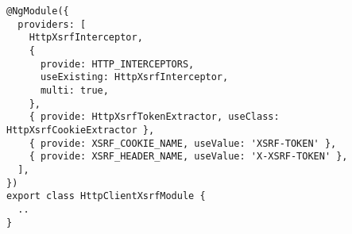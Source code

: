 \begin{verbatim}
@NgModule({
  providers: [
    HttpXsrfInterceptor,
    {
      provide: HTTP_INTERCEPTORS,
      useExisting: HttpXsrfInterceptor,
      multi: true,
    },
    { provide: HttpXsrfTokenExtractor, useClass: HttpXsrfCookieExtractor },
    { provide: XSRF_COOKIE_NAME, useValue: 'XSRF-TOKEN' },
    { provide: XSRF_HEADER_NAME, useValue: 'X-XSRF-TOKEN' },
  ],
})
export class HttpClientXsrfModule {
  ..
}
\end{verbatim}
